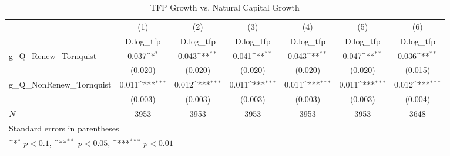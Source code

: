 \begin{table}[htbp]\centering
\def\sym#1{\ifmmode^{#1}\else\(^{#1}\)\fi}
\caption{TFP Growth vs. Natural Capital Growth}
\begin{tabular}{l*{6}{c}}
\hline\hline
            &\multicolumn{1}{c}{(1)}&\multicolumn{1}{c}{(2)}&\multicolumn{1}{c}{(3)}&\multicolumn{1}{c}{(4)}&\multicolumn{1}{c}{(5)}&\multicolumn{1}{c}{(6)}\\
            &\multicolumn{1}{c}{D.log\_tfp}&\multicolumn{1}{c}{D.log\_tfp}&\multicolumn{1}{c}{D.log\_tfp}&\multicolumn{1}{c}{D.log\_tfp}&\multicolumn{1}{c}{D.log\_tfp}&\multicolumn{1}{c}{D.log\_tfp}\\
\hline
g\_Q\_Renew\_Tornquist&       0.037\sym{*}  &       0.043\sym{**} &       0.041\sym{**} &       0.043\sym{**} &       0.047\sym{**} &       0.036\sym{**} \\
            &     (0.020)         &     (0.020)         &     (0.020)         &     (0.020)         &     (0.020)         &     (0.015)         \\
[1em]
g\_Q\_NonRenew\_Tornquist&       0.011\sym{***}&       0.012\sym{***}&       0.011\sym{***}&       0.011\sym{***}&       0.011\sym{***}&       0.012\sym{***}\\
            &     (0.003)         &     (0.003)         &     (0.003)         &     (0.003)         &     (0.003)         &     (0.004)         \\
\hline
\(N\)       &        3953         &        3953         &        3953         &        3953         &        3953         &        3648         \\
\hline\hline
\multicolumn{7}{l}{\footnotesize Standard errors in parentheses}\\
\multicolumn{7}{l}{\footnotesize \sym{*} \(p<0.1\), \sym{**} \(p<0.05\), \sym{***} \(p<0.01\)}\\
\end{tabular}
\end{table}
